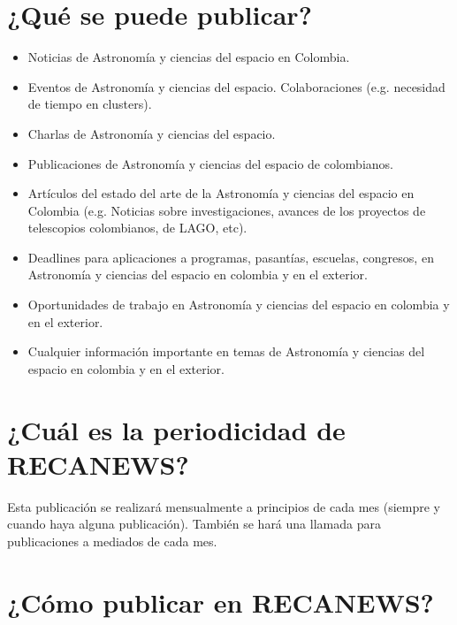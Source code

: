 \documentclass{book}
\begin{document}
\section*{¿Qué se puede publicar?}
\begin{itemize}
\item Noticias de Astronomía y ciencias del espacio en Colombia.
\item Eventos de Astronomía y ciencias del espacio.
Colaboraciones (e.g. necesidad de tiempo en clusters).
\item Charlas de Astronomía y ciencias del espacio.
\item Publicaciones de Astronomía y ciencias del espacio de colombianos.
\item Artículos del estado del arte de la Astronomía y ciencias del espacio en Colombia (e.g. Noticias sobre investigaciones, avances de los proyectos de telescopios colombianos, de LAGO, etc).
\item Deadlines para aplicaciones a programas, pasantías, escuelas, congresos, en Astronomía y ciencias del espacio  en colombia y en el exterior.
\item Oportunidades de trabajo en Astronomía y ciencias del espacio  en colombia y en el exterior.
\item Cualquier información importante en temas de Astronomía y ciencias del espacio  en colombia y en el exterior.
\end{itemize}


\section*{¿Cuál es la periodicidad de RECANEWS?}

Esta publicación se realizará mensualmente a principios de cada mes (siempre y cuando haya alguna publicación). También se hará una llamada para publicaciones a mediados de cada mes. 

\section*{¿Cómo publicar en RECANEWS?}
\end{document}
